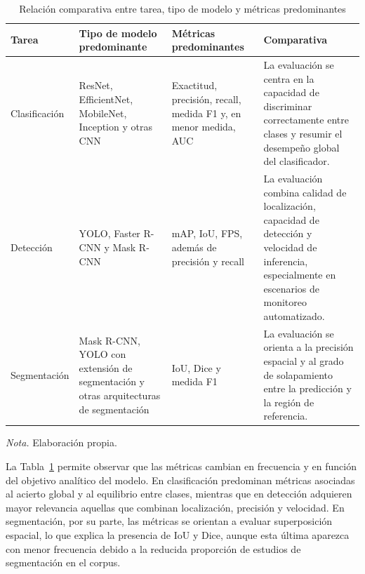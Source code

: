 \begin{table}[H]
    \centering
    \caption{Relación comparativa entre tarea, tipo de modelo y métricas predominantes}
    \label{tab:rq2-metricas-tarea-modelo}
    \small
    \begin{tabularx}{\textwidth}{p{2.2cm} p{4.0cm} p{4.0cm} X}
    \hline
    \textbf{Tarea} & \textbf{Tipo de modelo predominante} & \textbf{Métricas predominantes} & \textbf{Comparativa} \\
    \hline
    Clasificación & ResNet, EfficientNet, MobileNet, Inception y otras CNN & Exactitud, precisión, recall, medida F1 y, en menor medida, AUC & La evaluación se centra en la capacidad de discriminar correctamente entre clases y resumir el desempeño global del clasificador. \\
    
    Detección & YOLO, Faster R-CNN y Mask R-CNN & mAP, IoU, FPS, además de precisión y recall & La evaluación combina calidad de localización, capacidad de detección y velocidad de inferencia, especialmente en escenarios de monitoreo automatizado. \\
    
    Segmentación & Mask R-CNN, YOLO con extensión de segmentación y otras arquitecturas de segmentación & IoU, Dice y medida F1 & La evaluación se orienta a la precisión espacial y al grado de solapamiento entre la predicción y la región de referencia. \\
    \hline
    \end{tabularx}

    \vspace{-0.20 cm}
    \begin{flushleft}
    \normalfont\normalsize\textit{Nota.} Elaboración propia.
    \end{flushleft}
    
\end{table}

\vspace{-1.0 cm}
La Tabla~\ref{tab:rq2-metricas-tarea-modelo} permite observar que las métricas cambian en frecuencia y en función del objetivo analítico del modelo. En clasificación predominan métricas asociadas al acierto global y al equilibrio entre clases, mientras que en detección adquieren mayor relevancia aquellas que combinan localización, precisión y velocidad. En segmentación, por su parte, las métricas se orientan a evaluar superposición espacial, lo que explica la presencia de IoU y Dice, aunque esta última aparezca con menor frecuencia debido a la reducida proporción de estudios de segmentación en el corpus.

